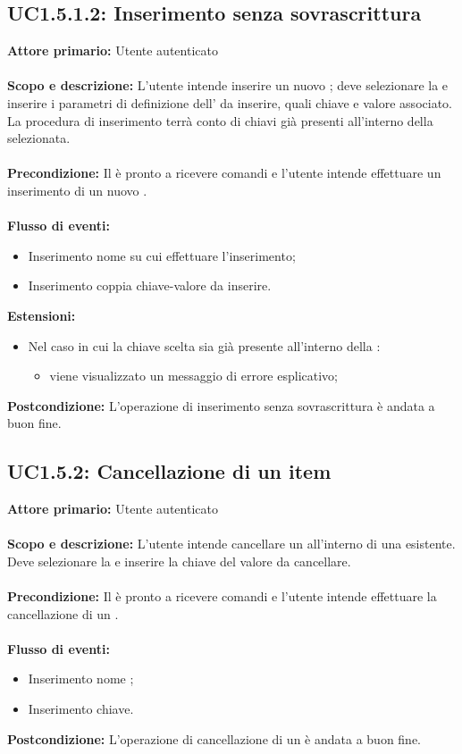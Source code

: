 \documentclass{scalatekids-article}
\begin{document}
\subsection{UC1.5.1.2: Inserimento senza sovrascrittura}
\textbf{Attore primario:} Utente autenticato \\ \\
\textbf{Scopo e descrizione:} L'utente intende inserire un nuovo ; deve selezionare la  e inserire i parametri di definizione dell' da inserire, quali chiave e valore associato. La procedura di inserimento terrà conto di chiavi già presenti all'interno della  selezionata.\\ \\
\textbf{Precondizione:} Il  è pronto a ricevere comandi e l'utente intende effettuare un inserimento di un nuovo .\\ \\
\textbf{Flusso di eventi:}
\begin{itemize}
\item Inserimento nome  su cui effettuare l'inserimento;
\item Inserimento coppia chiave-valore da inserire.
\end{itemize}
\textbf{Estensioni:}
\begin{itemize}
\item Nel caso in cui la chiave scelta sia già presente all'interno della :
  \begin{itemize}
  \item viene visualizzato un messaggio di errore esplicativo;
  \end{itemize}
\end{itemize}
\textbf{Postcondizione:} L'operazione di inserimento senza sovrascrittura è andata a buon fine.
\subsection{UC1.5.2: Cancellazione di un item}
\textbf{Attore primario:} Utente autenticato\\ \\
\textbf{Scopo e descrizione:} L'utente intende cancellare un  all'interno di una  esistente. Deve selezionare la  e inserire la chiave del valore da cancellare.\\ \\
\textbf{Precondizione:} Il  è pronto a ricevere comandi e l'utente intende effettuare la cancellazione di un .\\ \\
\textbf{Flusso di eventi:}
\begin{itemize}
\item Inserimento nome ;
\item Inserimento chiave.
\end{itemize}
\textbf{Postcondizione:} L'operazione di cancellazione di un  è andata a buon fine.
\end{document}
